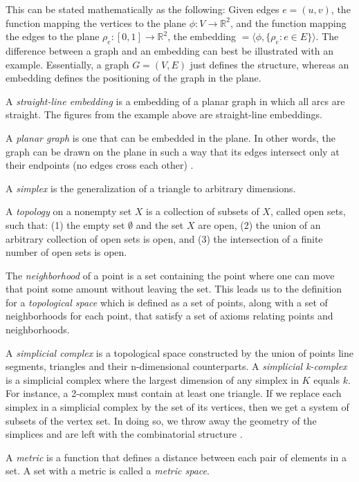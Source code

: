 \documentclass[11pt]{article}
\newcommand{\R}{\mathbb{R}}
\begin{document}
  This can be stated mathematically as the following: Given edges $e=(u,v)$, the function mapping the vertices to the plane $ \phi :V \rightarrow \R^2$, and the function mapping the edges to the plane $ \rho_e :[0,1] \rightarrow \R^2$, the embedding $= \langle \phi, \{\rho_e : e \in E \} \rangle$. The difference between a graph and an embedding can best be illustrated with an example. Essentially, a graph $G=(V,E)$ just defines the structure, whereas an embedding defines the positioning of the graph in the plane.

  A \emph{straight-line embedding} is a embedding of a planar graph in which all arcs are straight. The figures from the example above are straight-line embeddings.
  
  A \emph{planar graph} is one that can be embedded in the plane. 
  In other words, the graph can be drawn on the plane in such a way that its edges intersect only at their endpoints (no edges cross each other) \cite{mathworld:PlanarGraph}.

A \emph{simplex} is the generalization of a triangle to arbitrary dimensions.

A \emph{topology} on a nonempty set $X$ is a collection of subsets of $X$, called open sets, such that: (1) the empty set $\emptyset$ and the set $X$ are open, (2) the union of an arbitrary collection of open sets is open, and (3) the intersection of a finite number of open sets is open.
	
The \emph{neighborhood}	of a point is a set containing the point where one can move that point some amount without leaving the set. This leads us to the definition for a \emph{topological space} which is defined as a set of points, along with a set of neighborhoods for each point, that satisfy a set of axioms relating points and neighborhoods.

A \emph{simplicial complex} is a topological space constructed by the union of points line segments, triangles and their n-dimensional counterparts. A \emph{simplicial k-complex} is a simplicial complex where the largest dimension of any simplex in $K$ equals $k$. For instance, a 2-complex must contain at least one triangle. If we replace each simplex in a simplicial complex by the set of its vertices, then we get a system of subsets of the vertex set. In doing so, we throw away the geometry of the simplices and are left with the combinatorial structure \cite{simplicialComplexes}.

A \emph{metric} is a function that defines a distance between each pair of elements in a set. A set with a metric is called a \emph{metric space}.
\end{document}
